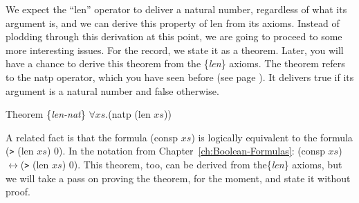 \begin{comment}
We also expect the ``len'' operator to deliver a natural number, regardless of what its argument is. We can state this in the form of a theorem using the ``natp'' operator, which delivers true if its argument is a natural number and false if it isn't.

\label{len-nat-thm}
\begin{lstlisting}
(defthmd len-is-natural-number-thm
  (natp (len xs)))
\end{lstlisting}

ACL2 succeeds in proving this theorem, too, so we now know that the formula (len $xs$) delivers a non-negative integer, regardless of what formula $xs$ stands for. We will use the label \{\emph{len-nat}\} when we cite this theorem in proofs.

A related fact is that the formula (consp $xs$) is logically equivalent to the formula (\verb+>+ (len $xs$) 0). In the notation from Chapter~\ref{ch:Boolean-Formulas}: (consp $xs$)$\leftrightarrow$(\verb+>+ (len $xs$) 0). The name of the equivalence operator in ACL2 is ``iff'', so in ACL2 notation, the formula would be:
(iff (consp $xs$) (\verb+>+ (len $xs$) 0)). Or, stated as a theorem, it looks like this:

\begin{lstlisting}
(defthmd consp<->len>0-thm
  (iff (consp xs) (> (len xs) 0)))
\end{lstlisting}
\end{comment}

We expect the ``len'' operator to deliver a natural number, regardless of what its argument is, and we can derive this property of len from its axioms. Instead of plodding through this derivation at this point, we are going to proceed to some more interesting issues. For the record, we state it as a theorem. Later, you will have a chance to derive this theorem from the \{\emph{len}\} axioms. The theorem refers to the natp operator, which you have seen before (see page \pageref{natp-op}). It delivers true if its argument is a natural number and false otherwise.

\label{len-nat-thm}
Theorem \{\emph{len-nat}\} $\forall xs.$(natp (len $xs$))

A related fact is that the formula (consp $xs$) is logically equivalent to the formula (\verb+>+ (len $xs$) 0). In the notation from Chapter~\ref{ch:Boolean-Formulas}: (consp $xs$)$\leftrightarrow$(\verb+>+ (len $xs$) 0). This theorem, too, can be derived from the\{\emph{len}\} axioms, but we will take a pass on proving the theorem, for the moment, and state it without proof.

